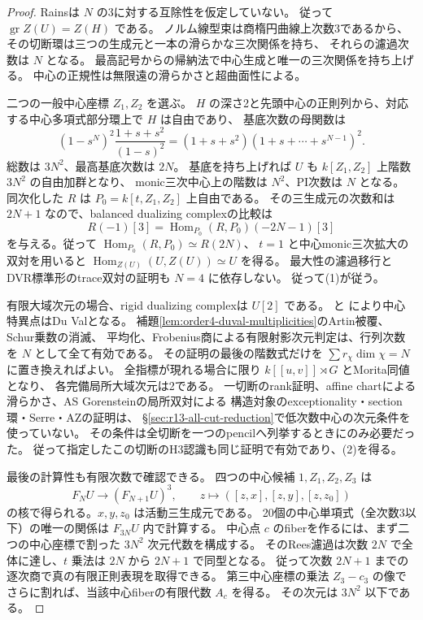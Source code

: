 \begin{proof}
Rains\cite[Theorem 2.13]{RainsCut}は $N$ の3に対する互除性を仮定していない。
従って $\operatorname{gr}Z(U)=Z(H)$ である。
ノルム線型束は商楕円曲線上次数3であるから、その切断環は三つの生成元と一本の滑らかな三次関係を持ち、
それらの濾過次数は $N$ となる。
最高記号からの帰納法で中心生成と唯一の三次関係を持ち上げる。
中心の正規性は無限遠の滑らかさと超曲面性による。

二つの一般中心座標 $Z_1,Z_2$ を選ぶ。
$H$ の深さ2と先頭中心の正則列から、対応する中心多項式部分環上で $H$ は自由であり、
基底次数の母関数は
\[
 (1-s^N)^2\frac{1+s+s^2}{(1-s)^2}
   =(1+s+s^2)(1+s+\cdots+s^{N-1})^2.
\]
総数は $3N^2$、最高基底次数は $2N$。
基底を持ち上げれば $U$ も $k[Z_1,Z_2]$ 上階数 $3N^2$ の自由加群となり、
monic三次中心上の階数は $N^2$、PI次数は $N$ となる。
同次化した $R$ は $P_0=k[t,Z_1,Z_2]$ 上自由である。
その三生成元の次数和は $2N+1$ なので、balanced dualizing complexの比較は
\[
 R(-1)[3]=\operatorname{Hom}_{P_0}(R,P_0)(-2N-1)[3]
\]
を与える。従って $\operatorname{Hom}_{P_0}(R,P_0)\simeq R(2N)$、
$t=1$ と中心monic三次拡大の双対を用いると
$\operatorname{Hom}_{Z(U)}(U,Z(U))\simeq U$ を得る。
最大性の濾過移行とDVR標準形のtrace双対の証明も $N=4$ に依存しない。
従って(1)が従う。

有限大域次元の場合、rigid dualizing complexは $U[2]$ である。
\cite[Proposition 2.6, Theorem 4.3]{SVdBRational}と
\cite[Theorem (0.3)]{ReidCanonicalSurface}により中心特異点はDu Valとなる。
補題\ref{lem:order4-duval-multiplicities}のArtin被覆、Schur乗数の消滅、
平均化、Frobenius商による有限射影次元判定は、行列次数を $N$ として全て有効である。
その証明の最後の階数式だけを $\sum r_\chi\dim\chi=N$ に置き換えればよい。
全指標が現れる場合に限り $k[[u,v]]\rtimes G$ とMorita同値となり、
各完備局所大域次元は2である。
一切断のrank証明、affine chartによる滑らかさ、AS Gorensteinの局所双対による
構造対象のexceptionality・section環・Serre・AZの証明は、
\S\ref{sec:r13-all-cut-reduction}で低次数中心の次元条件を使っていない。
その条件は全切断を一つのpencilへ列挙するときにのみ必要だった。
従って指定したこの切断のH3認識も同じ証明で有効であり、(2)を得る。

最後の計算性も有限次数で確認できる。
四つの中心候補 $1,Z_1,Z_2,Z_3$ は
\[
 F_NU\longrightarrow(F_{N+1}U)^3,\qquad z\longmapsto([z,x],[z,y],[z,z_0])
\]
の核で得られる。$x,y,z_0$ は活動三生成元である。
20個の中心単項式（全次数3以下）の唯一の関係は $F_{3N}U$ 内で計算する。
中心点 $c$ のfiberを作るには、まず二つの中心座標で割った $3N^2$ 次元代数を構成する。
そのRees濾過は次数 $2N$ で全体に達し、$t$ 乗法は $2N$ から $2N+1$ で同型となる。
従って次数 $2N+1$ までの逐次商で真の有限正則表現を取得できる。
第三中心座標の乗法 $Z_3-c_3$ の像でさらに割れば、当該中心fiberの有限代数 $A_c$ を得る。
その次元は $3N^2$ 以下である。


\end{proof}
